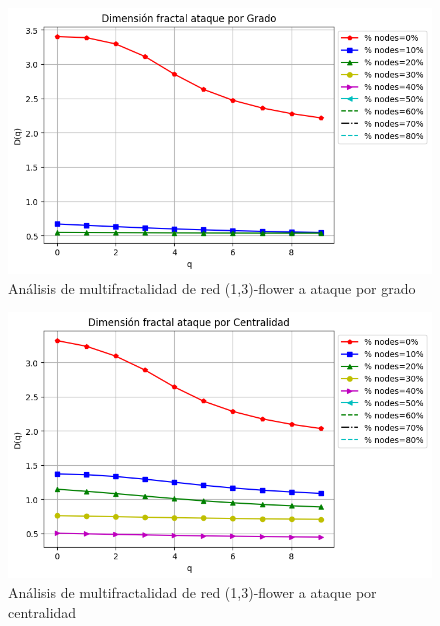 \begin{figure}[H]
    \centering
    \includegraphics[scale=0.7]{Capitulo6MultifractalidadYRobustez/imagenes/grafica_DqDegree20180501_151350floweru1v3.png}
    \caption{Análisis de multifractalidad de red (1,3)-flower a ataque por grado }
\end{figure}

\begin{figure}[H]
    \centering
    \includegraphics[scale=0.7]{Capitulo6MultifractalidadYRobustez/imagenes/grafica_DqCentrality20180501_151350floweru1v3.png}
    \caption{Análisis de multifractalidad de red (1,3)-flower a ataque por centralidad }
\end{figure}


